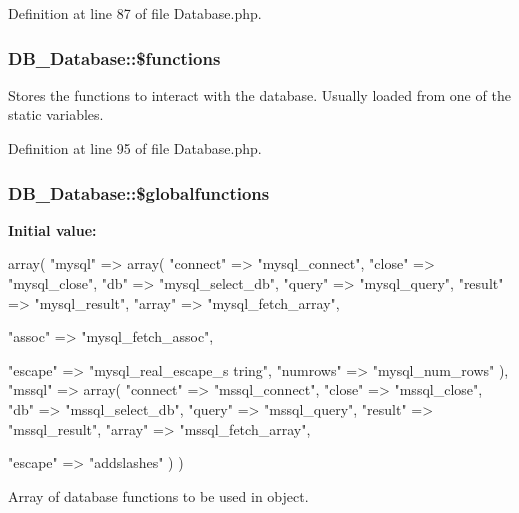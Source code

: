Definition at line 87 of file Database.php.\hypertarget{classDB__Database_acd9a4a4dae5229e946ab585b919e3563}{
\subsubsection[{\$functions}]{\setlength{\rightskip}{0pt plus 5cm}DB\_\-Database::\$functions}}
\label{d3/d63/classDB__Database_acd9a4a4dae5229e946ab585b919e3563}
Stores the functions to interact with the database. Usually loaded from one of the static variables. 

Definition at line 95 of file Database.php.\hypertarget{classDB__Database_a79a31df0a3e64b5758441ce9bc2ffa70}{
\subsubsection[{\$globalfunctions}]{\setlength{\rightskip}{0pt plus 5cm}DB\_\-Database::\$globalfunctions}}
\label{d3/d63/classDB__Database_a79a31df0a3e64b5758441ce9bc2ffa70}
{\bfseries Initial value:}
\begin{DoxyCode}
 array( "mysql" => array(
                                                "connect" => "mysql_connect",
                                                "close"   => "mysql_close",
                                                "db"      => "mysql_select_db",
                                                "query"   => "mysql_query",
                                                "result"  => "mysql_result",
                                                "array"   => "mysql_fetch_array",
      
                                                "assoc"   => "mysql_fetch_assoc",
      
                                                "escape"  => "mysql_real_escape_s
      tring",
                                                "numrows" => "mysql_num_rows" ),
                                         "mssql" => array(
                                                "connect" => "mssql_connect",
                                                "close"   => "mssql_close",
                                                "db"      => "mssql_select_db",
                                                "query"   => "mssql_query",
                                                "result"  => "mssql_result",
                                                "array"   => "mssql_fetch_array",
      
                                                "escape"  => "addslashes" )
                                 )
\end{DoxyCode}
Array of database functions to be used in object. 

